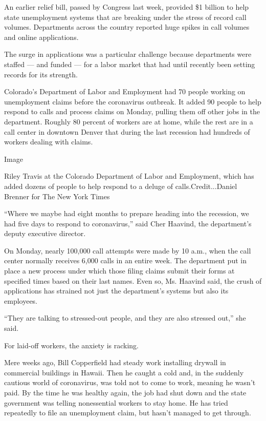 An earlier relief bill, passed by Congress last week, provided \$1
billion to help state unemployment systems that are breaking under the
stress of record call volumes. Departments across the country reported
huge spikes in call volumes and online applications.

The surge in applications was a particular challenge because departments
were staffed --- and funded --- for a labor market that had until
recently been setting records for its strength.

Colorado's Department of Labor and Employment had 70 people working on
unemployment claims before the coronavirus outbreak. It added 90 people
to help respond to calls and process claims on Monday, pulling them off
other jobs in the department. Roughly 80 percent of workers are at home,
while the rest are in a call center in downtown Denver that during the
last recession had hundreds of workers dealing with claims.

Image

Riley Travis at the Colorado Department of Labor and Employment, which
has added dozens of people to help respond to a deluge of
calls.Credit...Daniel Brenner for The New York Times

``Where we maybe had eight months to prepare heading into the recession,
we had five days to respond to coronavirus,'' said Cher Haavind, the
department's deputy executive director.

On Monday, nearly 100,000 call attempts were made by 10 a.m., when the
call center normally receives 6,000 calls in an entire week. The
department put in place a new process under which those filing claims
submit their forms at specified times based on their last names. Even
so, Ms. Haavind said, the crush of applications has strained not just
the department's systems but also its employees.

``They are talking to stressed-out people, and they are also stressed
out,'' she said.

For laid-off workers, the anxiety is racking.

Mere weeks ago, Bill Copperfield had steady work installing drywall in
commercial buildings in Hawaii. Then he caught a cold and, in the
suddenly cautious world of coronavirus, was told not to come to work,
meaning he wasn't paid. By the time he was healthy again, the job had
shut down and the state government was telling nonessential workers to
stay home. He has tried repeatedly to file an unemployment claim, but
hasn't managed to get through.

